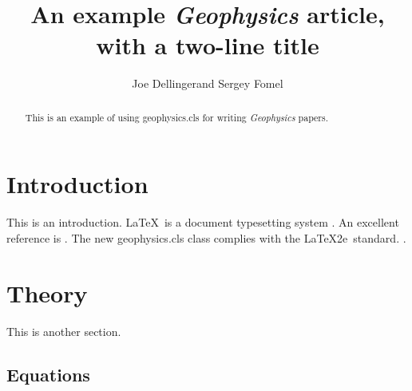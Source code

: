 \documentclass[paper,revised]{geophysics}
\begin{document}
\title{An example \emph{Geophysics} article, \\ with a two-line title}

\renewcommand{\thefootnote}{\fnsymbol{footnote}} 


\address{
\footnotemark[1]BP UTG, \\
200 Westlake Park Blvd, \\
Houston, TX, 77079 \\
\footnotemark[2]Bureau of Economic Geology, \\
John A. and Katherine G. Jackson School of Geosciences \\
The University of Texas at Austin \\
University Station, Box X \\
Austin, TX 78713-8924}
\author{Joe Dellinger\footnotemark[1] and Sergey Fomel\footnotemark[2]}


\maketitle

\begin{abstract}
  This is an example of using \textsf{geophysics.cls} for writing
  \emph{Geophysics} papers.
\end{abstract}

\section{Introduction}

This is an introduction. \LaTeX\ is a  document
typesetting system \cite[]{lamport}. An excellent reference is
\cite[]{kopka}. The new \textsf{geophysics.cls} class complies with
the \LaTeX2e\ standard. .

\section*{Theory}

This is another section. 

\subsection{Equations}
\end{document}
